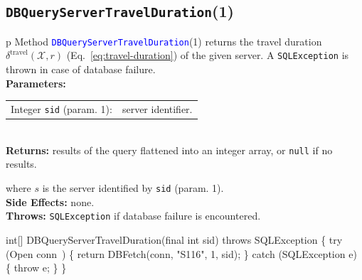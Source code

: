 \subsection{\texttt{DBQueryServerTravelDuration}(1)}
\begin{tabular}{p{\textwidth}}
\toprule
{}
Method \textcolor{blue}{{\tt{}\protect{}DBQueryServerTravelDuration}}(1) returns the
travel duration $\delta^\textrm{travel}(\mathcal{X},r)$
(Eq.~\ref{eq:travel-duration}) of the given server.
A {\tt{}SQLException} is thrown in case of database failure.\\
\midrule
\textbf{Parameters:}\\
\begin{tabular}{lp{116mm}}
Integer {\tt{}sid} (param. 1):&server identifier.
\end{tabular}\\
\textbf{Returns:} results of the query flattened into an integer array,
or {\tt{}null} if no results.


where $s$ is the server identified by {\tt{}sid} (param. 1).\\
\textbf{Side Effects:} none.\\
\textbf{Throws:} {\tt{}SQLException} if database failure is encountered.\\
\bottomrule
\end{tabular}
\nwenddocs{}\endmoddef{}
int[] DBQueryServerTravelDuration(final int sid) throws SQLException \{
  try (\LA{}Open \code{}conn\edoc{}~{\nwtagstyle{}}\RA{}) \{
    return DBFetch(conn, "S116", 1, sid);
  \} catch (SQLException e) \{
    throw e;
  \}
\}
\eatline
{}\nwendcode{}\nwdocspar
